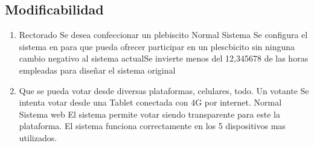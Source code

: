 \subsection{Modificabilidad}


\begin{enumerate}
 
\item  {}
{Rectorado}
{Se desea confeccionar un plebiscito}
{Normal}
{Sistema}
{Se configura el sistema en para que pueda ofrecer participar en un plescbicito sin ninguna cambio negativo al sistema actual}{Se invierte menos del 12,345678 de las horas empleadas para diseñar el sistema original}

\medskip
\item \escenario
{Que se pueda votar desde diversas plataformas, celulares, todo.}
{Un votante}
{Se intenta votar desde una Tablet conectada con 4G por internet.}
{Normal}
{Sistema web}
{El sistema permite votar siendo transparente para este la plataforma.}
{El sistema funciona correctamente en los 5 dispositivos mas utilizados.}



\end{enumerate}
